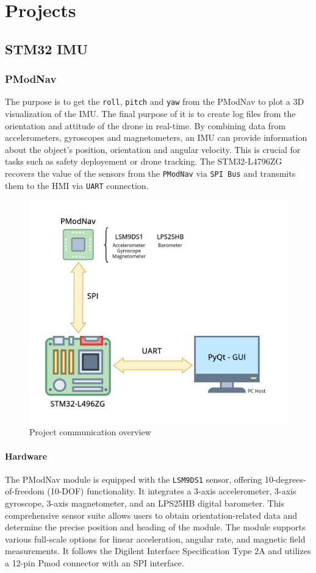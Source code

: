 \chapter{Projects}

\section{STM32 IMU}
\subsection{PModNav}
The purpose is to get the \texttt{roll}, \texttt{pitch} and \texttt{yaw} from the PModNav to plot a 3D visualization of the IMU. The final purpose of it is to create log files from the orientation and attitude of the drone in real-time. By combining data from accelerometers, gyroscopes and magnetometers, an IMU can provide information about the object's position, orientation and angular velocity. This is crucial for tasks such as safety deployement or drone tracking.
The STM32-L4796ZG recovers the value of the sensors from the \texttt{PModNav} via \texttt{SPI Bus} and transmits them to the HMI via \texttt{UART} connection.
\begin{figure}[H]
    \centering
    \includegraphics[width=0.65\linewidth]{./projects/pmodnav/com.png}
    \caption{Project communication overview}
\end{figure}

\subsubsection{Hardware}
The PModNav module is equipped with the \texttt{LSM9DS1}\cite{LSM9DS1_digilent_lib} sensor, offering 10-degrees-of-freedom (10-DOF) functionality. It integrates a 3-axis accelerometer, 3-axis gyroscope, 3-axis magnetometer, and an LPS25HB digital barometer. This comprehensive sensor suite allows users to obtain orientation-related data and determine the precise position and heading of the module. The module supports various full-scale options for linear acceleration, angular rate, and magnetic field measurements. It follows the Digilent Interface Specification Type 2A and utilizes a 12-pin Pmod connector with an SPI interface.

